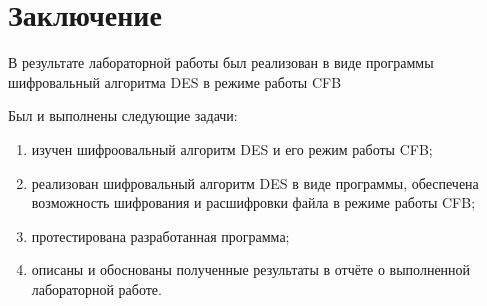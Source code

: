 \chapter*{Заключение}

В результате лабораторной работы был реализован в виде программы шифровальный алгоритма DES в режиме работы CFB 

Был и выполнены следующие задачи:
\begin{enumerate}[label=\arabic*)]
	\item изучен шифроовальный алгоритм  DES и его режим работы CFB;
    \item реализован шифровальный алгоритм DES в виде программы, обеспечена возможность шифрования и расшифровки файла в режиме работы CFB;
	\item протестирована разработанная программа;
	\item описаны и обоснованы полученные результаты в отчёте о выполненной лабораторной работе.
\end{enumerate}